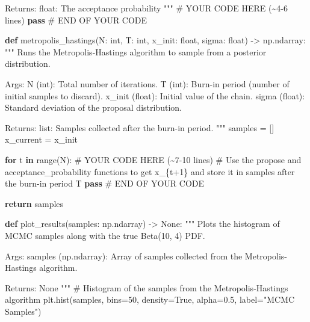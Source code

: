 \documentclass[
  letterpaper,
  numbers=noenddot,
  DIV=11,
  oneside]{scrreprt}
\newenvironment{Shaded}{\begin{snugshade}}{\end{snugshade}}
\newcommand{\BuiltInTok}[1]{\textcolor[rgb]{0.00,0.23,0.31}{#1}}
\newcommand{\CommentTok}[1]{\textcolor[rgb]{0.37,0.37,0.37}{#1}}
\newcommand{\ControlFlowTok}[1]{\textcolor[rgb]{0.00,0.23,0.31}{\textbf{#1}}}
\newcommand{\DecValTok}[1]{\textcolor[rgb]{0.68,0.00,0.00}{#1}}
\newcommand{\FloatTok}[1]{\textcolor[rgb]{0.68,0.00,0.00}{#1}}
\newcommand{\KeywordTok}[1]{\textcolor[rgb]{0.00,0.23,0.31}{\textbf{#1}}}
\newcommand{\NormalTok}[1]{\textcolor[rgb]{0.00,0.23,0.31}{#1}}
\newcommand{\OperatorTok}[1]{\textcolor[rgb]{0.37,0.37,0.37}{#1}}
\newcommand{\RegionMarkerTok}[1]{\textcolor[rgb]{0.00,0.23,0.31}{#1}}
\newcommand{\StringTok}[1]{\textcolor[rgb]{0.13,0.47,0.30}{#1}}
\newcommand{\VariableTok}[1]{\textcolor[rgb]{0.07,0.07,0.07}{#1}}
\theoremstyle{remark}
\begin{document}
\begin{Shaded}
\begin{Highlighting}[numbers=left,,]
\CommentTok{    Returns:}
\CommentTok{    float: The acceptance probability}
\CommentTok{    """}
    \CommentTok{\# YOUR CODE HERE (\textasciitilde{}4{-}6 lines)}
    \ControlFlowTok{pass}
    \CommentTok{\# }\RegionMarkerTok{END}\CommentTok{ OF YOUR CODE}


\KeywordTok{def}\NormalTok{ metropolis\_hastings(N: }\BuiltInTok{int}\NormalTok{, T: }\BuiltInTok{int}\NormalTok{, x\_init: }\BuiltInTok{float}\NormalTok{, sigma: }\BuiltInTok{float}\NormalTok{) }\OperatorTok{{-}\textgreater{}}\NormalTok{ np.ndarray:}
    \CommentTok{"""}
\CommentTok{    Runs the Metropolis{-}Hastings algorithm to sample from a posterior distribution.}

\CommentTok{    Args:}
\CommentTok{    N (int): Total number of iterations.}
\CommentTok{    T (int): Burn{-}in period (number of initial samples to discard).}
\CommentTok{    x\_init (float): Initial value of the chain.}
\CommentTok{    sigma (float): Standard deviation of the proposal distribution.}

\CommentTok{    Returns:}
\CommentTok{    list: Samples collected after the burn{-}in period.}
\CommentTok{    """}
\NormalTok{    samples }\OperatorTok{=}\NormalTok{ []}
\NormalTok{    x\_current }\OperatorTok{=}\NormalTok{ x\_init}

    \ControlFlowTok{for}\NormalTok{ t }\KeywordTok{in} \BuiltInTok{range}\NormalTok{(N):}
        \CommentTok{\# YOUR CODE HERE (\textasciitilde{}7{-}10 lines)}
        \CommentTok{\# Use the propose and acceptance\_probability functions to get x\_\{t+1\} and store it in samples after the burn{-}in period T}
        \ControlFlowTok{pass}
        \CommentTok{\# }\RegionMarkerTok{END}\CommentTok{ OF YOUR CODE}

    \ControlFlowTok{return}\NormalTok{ samples}


\KeywordTok{def}\NormalTok{ plot\_results(samples: np.ndarray) }\OperatorTok{{-}\textgreater{}} \VariableTok{None}\NormalTok{:}
    \CommentTok{"""}
\CommentTok{    Plots the histogram of MCMC samples along with the true Beta(10, 4) PDF.}

\CommentTok{    Args:}
\CommentTok{    samples (np.ndarray): Array of samples collected from the Metropolis{-}Hastings algorithm.}

\CommentTok{    Returns:}
\CommentTok{    None}
\CommentTok{    """}
    \CommentTok{\# Histogram of the samples from the Metropolis{-}Hastings algorithm}
\NormalTok{    plt.hist(samples, bins}\OperatorTok{=}\DecValTok{50}\NormalTok{, density}\OperatorTok{=}\VariableTok{True}\NormalTok{, alpha}\OperatorTok{=}\FloatTok{0.5}\NormalTok{, label}\OperatorTok{=}\StringTok{"MCMC Samples"}\NormalTok{)}


\end{Highlighting}
\end{Shaded}
\end{document}
